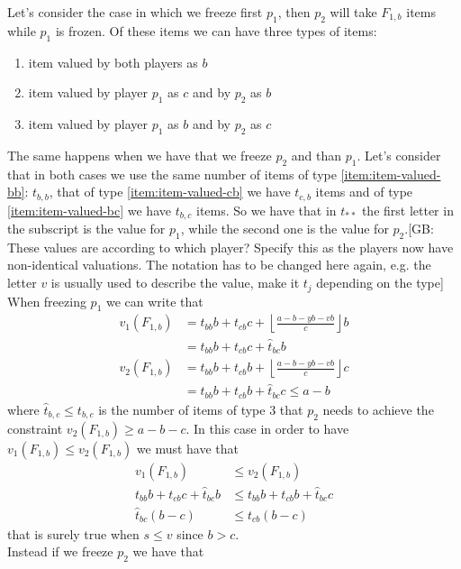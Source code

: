 \documentclass{article}
\newcommand{\gb}[1]{{\color{red}[GB: #1]}}
\begin{document}
Let's consider the case in which we freeze first $p_1$, then $p_2$ will take $F_{1,b}$ items while $p_1$ is frozen. Of these items we can have three types of items: 
\begin{enumerate}
    \item item valued by both players as $b$ \label{item:item-valued-bb}%
    \item item valued by player $p_1$ as $c$ and by $p_2$ as $b$ \label{item:item-valued-cb} %
    \item item valued by player $p_1$ as $b$ and by $p_2$ as $c$ \label{item:item-valued-bc}%
\end{enumerate}
The same happens when we have that we freeze $p_2$ and than $p_1$. Let's consider that in both cases we use the same number of items of type \ref{item:item-valued-bb}: $t_{b,b}$, that of type \ref{item:item-valued-cb} we have $t_{c,b}$ items and of type \ref{item:item-valued-bc} we have $t_{b,c}$ items. So we have that in $t_{**}$ the first letter in the subscript is the value for $p_1$, while the second one is the value for $p_2$.\gb{These values are according to which player? Specify this as the players now have non-identical valuations. The notation has to be changed here again, e.g. the letter $v$ is usually used to describe the value, make it $t_j$ depending on the type} 
When freezing $p_1$ we can write that 
\begin{align*}
    v_1(F_{1,b}) &= t_{bb}b + t_{cb}c + \left\lfloor \frac{a-b-yb-vb}{c}\right\rfloor b \\
                & = t_{bb}b + t_{cb}c + \hat{t}_{bc} b\\
    v_2(F_{1,b}) &= t_{bb}b + t_{cb}b + \left\lfloor \frac{a-b-yb-vb}{c}\right\rfloor c \\
                & = t_{bb}b + t_{cb}b + \hat{t}_{bc} c \le a-b
\end{align*}
where $\hat{t}_{b,c}\le t_{b,c}$ is the number of items of type $3$ that $p_2$ needs to achieve the constraint $v_2(F_{1,b})\ge a-b-c$. In this case in order to have $v_1(F_{1,b}) \le v_2(F_{1,b})$ we must have that
\begin{align*}
    v_1(F_{1,b}) &\le v_2(F_{1,b})\\
    t_{bb}b + t_{cb}c + \hat{t}_{bc} b &\le t_{bb}b + t_{cb}b + \hat t_{bc} c\\
    \hat t_{bc}(b-c) &\le t_{cb}(b-c)
\end{align*}
that is surely true when $s\le v$ since $b> c$.\\
Instead if we freeze $p_2$ we have that
\end{document}
